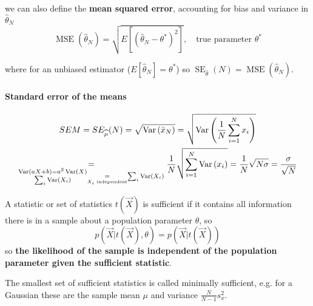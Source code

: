 we can also define the \textbf{mean squared error}, accounting for bias and variance in $\hat{\theta}_N$
\begin{equation}
    \operatorname{MSE}(\hat{\theta}_N) = \sqrt{E\left[ (\hat{\theta}_N - \theta^*)^2 \right]}, \quad \text{true parameter } \theta^*
\end{equation}

where for an unbiased estimator ($E[\hat{\theta}_N] = \theta^*$) so $\operatorname{SE}_{\hat{\theta}}(N) = \operatorname{MSE}(\hat{\theta}_N)$.

\paragraph*{Standard error of the means}
\begin{equation}
    \begin{gathered}
        S E M=S E_{\widehat{\mu}}(N)=\sqrt{\operatorname{Var}\left(\bar{x}_N\right)}=\sqrt{\operatorname{Var}\left(\frac{1}{N} \sum_{i=1}^N x_i\right)} \\
        \underset{\substack{\operatorname{Var}(a X+b)=a^2 \operatorname{Var}(X) \\
        \sum_i \operatorname{Var}\left(X_i\right)} \underset{X_i \text{ independent}}{=} \sum_i \operatorname{Var}(X_i)}{=} \frac{1}{N} \sqrt{\sum_{i=1}^N \operatorname{Var}\left(x_i\right)}=\frac{1}{N} \sqrt{N \sigma}=\frac{\sigma}{\sqrt{N}}
    \end{gathered}     
\end{equation}


A statistic or set of statistics $t(\vec{X})$ is sufficient if it contains all information there is in a sample
about a population parameter $\theta$, so
\begin{equation}
   p(\vec{X} | t(\vec{X}), \theta) = p(\vec{X} | t(\vec{X}))
\end{equation}
so \textbf{the likelihood of the sample is independent of the population parameter given the sufficient statistic}.

The smallest set of sufficient statistics is called minimally sufficient, e.g. for a Gaussian these
are the sample mean $\mu$ and variance $\frac{N}{N-1} s_x^2$.

